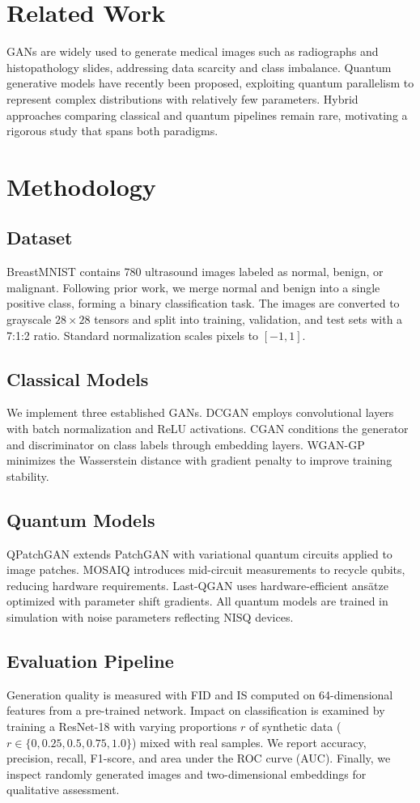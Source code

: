\documentclass[pdflatex,sn-mathphys-num]{sn-jnl}
\theoremstyle{thmstyleone}
\theoremstyle{thmstyletwo}
\theoremstyle{thmstylethree}
\begin{document}
\section{Related Work}\label{sec:related}
GANs are widely used to generate medical images such as radiographs and histopathology slides, addressing data scarcity and class imbalance. Quantum generative models have recently been proposed, exploiting quantum parallelism to represent complex distributions with relatively few parameters. Hybrid approaches comparing classical and quantum pipelines remain rare, motivating a rigorous study that spans both paradigms.

\section{Methodology}\label{sec:method}
\subsection{Dataset}
BreastMNIST contains 780 ultrasound images labeled as normal, benign, or malignant. Following prior work, we merge normal and benign into a single positive class, forming a binary classification task. The images are converted to grayscale \(28\times28\) tensors and split into training, validation, and test sets with a 7:1:2 ratio. Standard normalization scales pixels to \([-1,1]\).

\subsection{Classical Models}
We implement three established GANs. DCGAN employs convolutional layers with batch normalization and ReLU activations. CGAN conditions the generator and discriminator on class labels through embedding layers. WGAN-GP minimizes the Wasserstein distance with gradient penalty to improve training stability.

\subsection{Quantum Models}
QPatchGAN extends PatchGAN with variational quantum circuits applied to image patches. MOSAIQ introduces mid-circuit measurements to recycle qubits, reducing hardware requirements. Last-QGAN uses hardware-efficient ans\"atze optimized with parameter shift gradients. All quantum models are trained in simulation with noise parameters reflecting NISQ devices.

\subsection{Evaluation Pipeline}
Generation quality is measured with FID and IS computed on 64-dimensional features from a pre-trained network. Impact on classification is examined by training a ResNet-18 with varying proportions \(r\) of synthetic data (\(r\in\{0,0.25,0.5,0.75,1.0\}\)) mixed with real samples. We report accuracy, precision, recall, F1-score, and area under the ROC curve (AUC). Finally, we inspect randomly generated images and two-dimensional embeddings for qualitative assessment.
\end{document}
